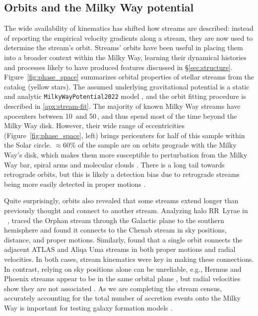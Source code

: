 \documentclass[final,5p,times,twocolumn,authoryear]{elsarticle}
\begin{document}
\subsection{Orbits and the Milky Way potential}
\label{sec:mwpotential}
The wide availability of kinematics has shifted how streams are described: instead of reporting the empirical velocity gradients along a stream, they are now used to determine the stream's orbit.
Streams' orbits have been useful in placing them into a broader context within the Milky Way, learning their dynamical histories and processes likely to have produced features discussed in \S\ref{sec:structure}.
Figure~\ref{fig:phase_space} summarizes orbital properties of stellar streams from the \citet{ibata:2023} catalog (yellow stars).
The assumed underlying gravitational potential is a static and analytic \texttt{MilkyWayPotential2022} model \citep{price-whelan:2017}, and the orbit fitting procedure is described in \ref{apx:stream-fit}.
The majority of known Milky Way streams have apocenters between 10\,\unit{\kpc} and 50\,\unit{\kpc}, and thus spend most of the time beyond the Milky Way disk.
However, their wide range of eccentricities (Figure~\ref{fig:phase_space}, left) brings pericenters for half of this sample within the Solar circle.
$\approx60\%$ of the sample are on orbits prograde with the Milky Way's disk, which makes them more susceptible to perturbation from the Milky Way bar, spiral arms and molecular clouds \citep[e.g.,][]{pearson:2017, banik:2019}.
There is a long tail towards retrograde orbits, but this is likely a detection bias due to retrograde streams being more easily detected in proper motions \citep[e.g.,][]{ibata:2021}.

Quite surprisingly, orbits also revealed that some streams extend longer than previously thought and connect to another stream.
Analyzing halo RR~Lyrae in \gaia~, \citet{koposov:2019} traced the Orphan stream through the Galactic plane to the southern hemisphere and found it connects to the Chenab stream in sky positions, distance, and proper motions.
Similarly, \citet{li:2021} found that a single orbit connects the adjacent ATLAS and Aliqa Uma streams in both proper motions and radial velocities.
In both cases, stream kinematics were key in making these connections.
In contrast, relying on sky positions alone can be unreliable, e.g., Hermus and Phoenix streams appear to be in the same orbital plane \citep{grillmair:2016b}, but radial velocities show they are not associated \citep{martin:2018}.
As we are completing the stream census, accurately accounting for the total number of accretion events onto the Milky Way is important for testing galaxy formation models \citep{pillepich:2015, shipp:2023, wright:2023, khoperskov:2023}.
\end{document}
